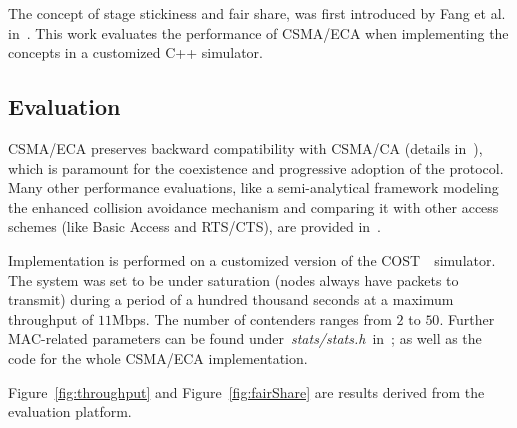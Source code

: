 The concept of stage stickiness and fair share, was first introduced by Fang et al. in~\cite{L_MAC}. This work evaluates the performance of CSMA/ECA when implementing the concepts in a customized C++ simulator.


\subsection*{Evaluation}
CSMA/ECA preserves backward compatibility with CSMA/CA (details in~\cite{CSMA_ECA}), which is paramount for the coexistence and progressive adoption of the protocol. Many other performance evaluations, like a semi-analytical framework modeling the enhanced collision avoidance mechanism and comparing it with other access schemes (like Basic Access and RTS/CTS), are provided in~\cite{E2CA_performance}.

Implementation is performed on a customized version of the COST~\cite{COST}~simulator. The system was set to be under saturation (nodes always have packets to transmit) during a period of a hundred thousand seconds at a maximum throughput of $11$Mbps. The number of contenders ranges from $2$ to $50$. Further MAC-related parameters can be found under~\emph{stats/stats.h}~in~\cite{sim:parameters}; as well as the code for the whole CSMA/ECA implementation.

Figure~\ref{fig:throughput} and Figure~\ref{fig:fairShare} are results derived from the evaluation platform.
